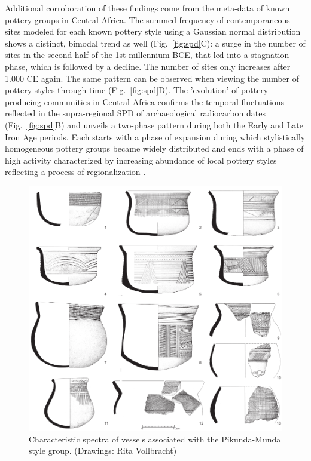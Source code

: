 \documentclass[smallextended,natbib]{svjour3}       %
\begin{document}
Additional corroboration of these findings come from the meta-data of known pottery groups in Central Africa. The summed frequency of contemporaneous sites modeled for each known pottery style using a Gaussian normal distribution \citet{Roberts.2012} shows a distinct, bimodal trend as well (Fig.~\ref{fig:spd}C): a surge in the number of sites in the second half of the 1st millennium BCE, that led into a stagnation phase, which is followed by a decline. The number of sites only increases after 1.000 CE again. The same pattern can be observed when viewing the number of pottery styles through time (Fig.~\ref{fig:spd}D). The 'evolution' of pottery producing communities in Central Africa confirms the temporal fluctuations reflected in the supra-regional SPD of archaeological radiocarbon dates (Fig.~\ref{fig:spd}B) and unveils a two-phase pattern during both the Early and Late Iron Age periods. Each starts with a phase of expansion during which stylistically homogeneous pottery groups became widely distributed and ends with a phase of high activity characterized by increasing abundance of local pottery styles reflecting a process of regionalization \citep{Seidensticker.2021}. 

\begin{figure}[!tb]
	\includegraphics[width=\textwidth]{Fig_PKMvessels.pdf}
	\caption{Characteristic spectra of vessels associated with the Pikunda-Munda style group. (Drawings: Rita Vollbracht)}
	\label{fig:pkmtypes}
\end{figure}
\end{document}

